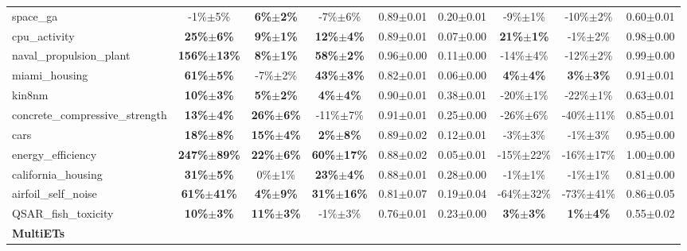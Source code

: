 \begin{table}[h]
\begin{small}
\begin{sc}
{\begin{tabular}{lcccccccc}
space\_ga  &  -1\%$\pm$5\%  &  \textbf{6\%$\pm$2\%}  &  -7\%$\pm$6\%  &  0.89$\pm$0.01  &  0.20$\pm$0.01  &  -9\%$\pm$1\%  &  -10\%$\pm$2\%  &  0.60$\pm$0.01 \\
cpu\_activity  &  \textbf{25\%$\pm$6\%}  &  \textbf{9\%$\pm$1\%}  &  \textbf{12\%$\pm$4\%}  &  0.89$\pm$0.01  &  0.07$\pm$0.00  &  \textbf{21\%$\pm$1\%}  &  -1\%$\pm$2\%  &  0.98$\pm$0.00 \\
naval\_propulsion\_plant  &  \textbf{156\%$\pm$13\%}  &  \textbf{8\%$\pm$1\%}  &  \textbf{58\%$\pm$2\%}  &  0.96$\pm$0.00  &  0.11$\pm$0.00  &  -14\%$\pm$4\%  &  -12\%$\pm$2\%  &  0.99$\pm$0.00 \\
miami\_housing  &  \textbf{61\%$\pm$5\%}  &  -7\%$\pm$2\%  &  \textbf{43\%$\pm$3\%}  &  0.82$\pm$0.01  &  0.06$\pm$0.00  &  \textbf{4\%$\pm$4\%}  &  \textbf{3\%$\pm$3\%}  &  0.91$\pm$0.01 \\
kin8nm  &  \textbf{10\%$\pm$3\%}  &  \textbf{5\%$\pm$2\%}  &  \textbf{4\%$\pm$4\%}  &  0.90$\pm$0.01  &  0.38$\pm$0.01  &  -20\%$\pm$1\%  &  -22\%$\pm$1\%  &  0.63$\pm$0.01 \\
concrete\_compressive\_strength  &  \textbf{13\%$\pm$4\%}  &  \textbf{26\%$\pm$6\%}  &  -11\%$\pm$7\%  &  0.91$\pm$0.01  &  0.25$\pm$0.00  &  -26\%$\pm$6\%  &  -40\%$\pm$11\%  &  0.85$\pm$0.01 \\
cars  &  \textbf{18\%$\pm$8\%}  &  \textbf{15\%$\pm$4\%}  &  \textbf{2\%$\pm$8\%}  &  0.89$\pm$0.02  &  0.12$\pm$0.01  &  -3\%$\pm$3\%  &  -1\%$\pm$3\%  &  0.95$\pm$0.00 \\
energy\_efficiency  &  \textbf{247\%$\pm$89\%}  &  \textbf{22\%$\pm$6\%}  &  \textbf{60\%$\pm$17\%}  &  0.88$\pm$0.02  &  0.05$\pm$0.01  &  -15\%$\pm$22\%  &  -16\%$\pm$17\%  &  1.00$\pm$0.00 \\
california\_housing  &  \textbf{31\%$\pm$5\%}  &  0\%$\pm$1\%  &  \textbf{23\%$\pm$4\%}  &  0.88$\pm$0.01  &  0.28$\pm$0.00  &  -1\%$\pm$1\%  &  -1\%$\pm$1\%  &  0.81$\pm$0.00 \\
airfoil\_self\_noise  &  \textbf{61\%$\pm$41\%}  &  \textbf{4\%$\pm$9\%}  &  \textbf{31\%$\pm$16\%}  &  0.81$\pm$0.07  &  0.19$\pm$0.04  &  -64\%$\pm$32\%  &  -73\%$\pm$41\%  &  0.86$\pm$0.05 \\
QSAR\_fish\_toxicity  &  \textbf{10\%$\pm$3\%}  &  \textbf{11\%$\pm$3\%}  &  -1\%$\pm$3\%  &  0.76$\pm$0.01  &  0.23$\pm$0.00  &  \textbf{3\%$\pm$3\%}  &  \textbf{1\%$\pm$4\%}  &  0.55$\pm$0.02 \\
\cmidrule(lr){1-9}
\textbf{MultiETs} & & & & & & & & \\ \cmidrule(lr){1-9}


\end{tabular}}
\end{sc}
\end{small}
\end{table}
